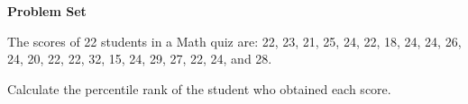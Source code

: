 \textbf{Problem Set}

\vspce

The scores of 22 students in a Math quiz are: 22, 23, 21, 25, 24, 22, 18, 24, 24, 26, 24, 20, 22, 22, 32, 15, 24, 29, 27, 22, 24, and 28.

Calculate the percentile rank of the student who obtained each score. 
\begin{enumerate}[label = \arabic*. ]
\begin{multicols}{2}
\item  {}
\item  {}
\item  {}
\item {}
\item {}
\end{multicols} 
\end{enumerate}   